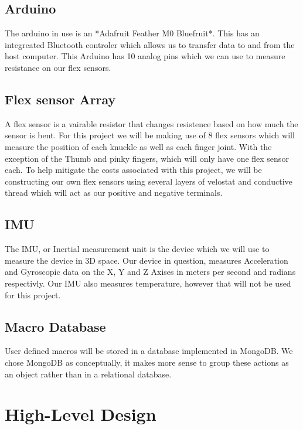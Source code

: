 \documentclass[12pt,a4paper,oneside]{book}
\theoremstyle{plain}
\numberwithin{equation}{chapter}
\newcounter{Chapnum}
\newcounter{Secnum}
\begin{document}
\newpage
{}
\section{Arduino}

\noindent The arduino in use is an *Adafruit Feather M0 Bluefruit*. This has an integreated Bluetooth controler which allows us to transfer data to and from the host computer. This Arduino has 10 analog pins which we can use to measure resistance on our flex sensors.

\section{Flex sensor Array}

\noindent A flex sensor is a vairable resistor that changes resistence based on how much the sensor is bent. For this project we will be making use of 8 flex sensors which will measure the position of each knuckle as well as each finger joint. With the exception of the Thumb and pinky fingers, which will only have one flex sensor each. To help mitigate the costs associated with this project, we will be constructing our own flex sensors using several layers of velostat and conductive thread which will act as our positive and negative terminals.

\section{IMU}

\noindent The IMU, or Inertial measurement unit is the device which we will use to measure the device in 3D space. Our device in question, measures Acceleration and Gyroscopic data on the X, Y and Z Axises in meters per second and radians respectivly. Our IMU also measures temperature, however that will not be used for this project.

\section{Macro Database}

\noindent User defined macros will be stored in a database implemented in MongoDB. We chose MongoDB as conceptually, it makes more sense to group these actions as an object rather than in a relational database.

\chapter*{High-Level Design}
\end{document}
